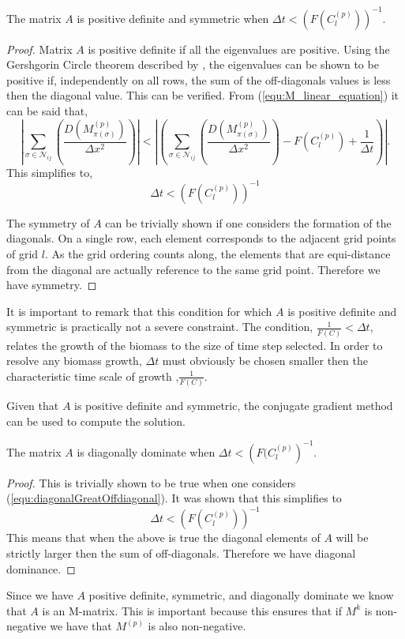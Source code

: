 \begin{prop}
  The matrix $A$ is positive definite and symmetric when $ \Delta t < \left( { F(C^{(p)}_{l}) } \right)^{-1}$.
\end{prop}
\begin{proof}
  Matrix $A$ is positive definite if all the eigenvalues are positive. 
  Using the Gershgorin Circle theorem described by \cite{varga2004gersgorin}, the eigenvalues can be shown to be positive if, independently on all rows, the sum of the off-diagonals values is less then the diagonal value.
  This can be verified. From (\ref{equ:M_linear_equation}) it can be said that,
  \begin{equation} \label{equ:diagonalGreatOffdiagonal}
    \left| \sum_{\sigma \in \mathcal{N}_{ij}} \left( \frac{D( M^{(p)}_{\pi(\sigma)} )}{\Delta x^2} \right) \right|
     < \left| \left( \sum_{\sigma \in \mathcal{N}_{ij}} \left( \frac{D( M^{(p)}_{\pi(\sigma)} )}{\Delta x^2} \right) 
    - F(C^{(p)}_{l}) + \frac{1}{\Delta t} \right) \right|.
  \end{equation}
  This simplifies to,
  \begin{equation}
    \Delta t < \left( { F(C^{(p)}_{l}) } \right)^{-1} 
  \end{equation}

  The symmetry of $A$ can be trivially shown if one considers the formation of the diagonals.
  On a single row, each element corresponds to the adjacent grid points of grid $l$.
  As the grid ordering counts along, the elements that are equi-distance from the diagonal are actually reference to the same grid point. 
  Therefore we have symmetry. 
\end{proof} 

It is important to remark that this condition for which $A$ is positive definite and symmetric is practically not a severe constraint.
The condition, $\frac{1}{F(C)} < \Delta t$, relates the growth of the biomass to the size of time step selected.
In order to resolve any biomass growth, $\Delta t$ must obviously be chosen smaller then the characteristic time scale of growth ,$\frac{1}{F(C)}$.

Given that $A$ is positive definite and symmetric, the conjugate gradient method can be used to compute the solution.

\begin{prop}
  The matrix $A$ is diagonally dominate when $\Delta t < \left( { F(C^{(p)}_{l}} \right)^{-1}$.
\end{prop}
\begin{proof}
  This is trivially shown to be true when one considers (\ref{equ:diagonalGreatOffdiagonal}).
  It was shown that this simplifies to 
  \begin{equation}
    \Delta t < \left( { F(C^{(p)}_{l}) } \right)^{-1}
  \end{equation}
  This means that when the above is true the diagonal elements of $A$ will be strictly larger then the sum of off-diagonals.
  Therefore we have diagonal dominance.
\end{proof}
Since we have $A$ positive definite, symmetric, and diagonally dominate we know that $A$ is an M-matrix.
This is important because this ensures that if $M^k$ is non-negative we have that $M^{(p)}$ is also non-negative.

